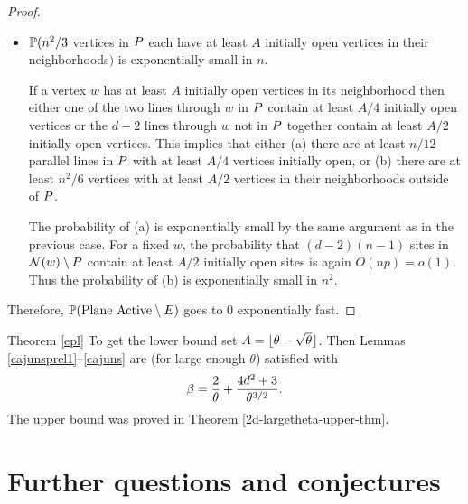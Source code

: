\begin{proof}
\begin{itemize}
\item  $\mathbb{P}(n^2/3$ vertices in $P$ each have at least $A$ initially open vertices 
in their neighborhoods$)$ is exponentially small in $n$. 

If a vertex $w$ has at least $A$ initially open vertices in its neighborhood  
then either one of the two lines through $w$ in $P$ contain at least $A/4$  
initially open vertices or the $d-2$ lines through $w$ not in $P$ together  
contain at least $A/2$ initially open vertices.
This implies that either (a) there are at least $n/12$ parallel lines in $P$ with at least $A/4$ vertices initially open, or (b) there are at least $n^2/6$ vertices with at 
least $A/2$ vertices in their neighborhoods outside of 
$P$.  

The probability of (a) is exponentially small by the same argument as in the previous case. 
For a fixed $w$, the probability that $(d-2)(n-1)$ sites in $\mathcal{N}(w)\setminus P$ 
contain at least $A/2$ initially open sites 
is again $O(np)=o(1)$. Thus the probability of (b) is exponentially small in $n^2$. 

\begin{comment}
The probability of the first is at most
$$2{n \choose n/12}\left({n \choose A/4}p^{A/4}\right)^{n/12}\leq 
2\cdot 2^n\left(n^{-\beta A/4}\right)^{n/12}\leq n^{-cn}=o\left(n^{-(d-2)}\right)$$
and the second has probability at most
$$ {n^2 \choose n^2/6}\left({dn \choose A/2}p^{A/2}\right)^{n^2/6}\leq 
c \cdot 2^{n^2}\left(n^{-\beta A/2}\right)^{n^2/6}\leq n^{-cn^2}=o\left(n^{-(d-2)}\right).$$
\end{comment}
\end{itemize}
Therefore,  $\mathbb{P}(\text{Plane Active} \setminus E)$ goes to 0 exponentially fast.
\end{proof}

\begin{pfofthm}{Theorem \ref{epl}} To get the lower bound
set $A=\lfloor \theta -\sqrt{\theta}\rfloor$. Then Lemmas \ref{cajunsprel1}--\ref{cajuns}
are (for large enough $\theta$) satisfied with
$$\beta = \frac{2}{\theta} + \frac{4d^2 + 3}{\theta^{3/2}}.$$
The upper bound was proved in Theorem \ref{2d-largetheta-upper-thm}. 
\end{pfofthm}

\section{Further questions and conjectures}
\label{open}

